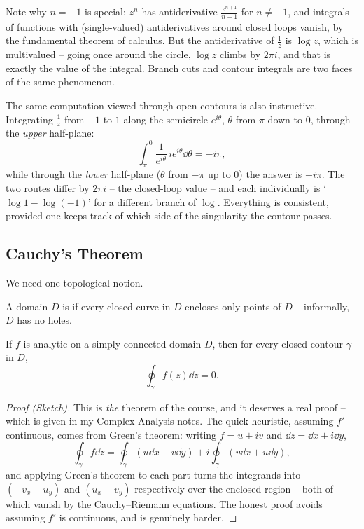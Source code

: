 Note why $n = -1$ is special: $z^n$ has antiderivative $\frac{z^{n+1}}{n+1}$ for $n \neq -1$, and integrals of functions with (single-valued) antiderivatives around closed loops vanish, by the fundamental theorem of calculus. But the antiderivative of $\frac 1z$ is $\log z$, which is multivalued -- going once around the circle, $\log z$ climbs by $2\pi i$, and that is exactly the value of the integral. Branch cuts and contour integrals are two faces of the same phenomenon.

The same computation viewed through open contours is also instructive. Integrating $\frac 1z$ from $-1$ to $1$ along the semicircle $e^{i\theta}$, $\theta$ from $\pi$ down to $0$, through the \emph{upper} half-plane:
$$
\int_\pi^0 \frac{1}{e^{i\theta}} \, ie^{i\theta} \dd \theta = -i\pi,
$$
while through the \emph{lower} half-plane ($\theta$ from $-\pi$ up to $0$) the answer is $+i\pi$. The two routes differ by $2\pi i$ -- the closed-loop value -- and each individually is `$\log 1 - \log(-1)$' for a different branch of $\log$. Everything is consistent, provided one keeps track of which side of the singularity the contour passes.

\subsection{Cauchy's Theorem}

We need one topological notion.

\begin{definition}
	A domain $D$ is  if every closed curve in $D$ encloses only points of $D$ -- informally, $D$ has no holes.
\end{definition}

\begin{theorem}
	If $f$ is analytic on a simply connected domain $D$, then for every closed contour $\gamma$ in $D$,
	$$
	\oint_\gamma f(z) \dd z = 0.
	$$
\end{theorem}
\begin{proof}[Proof (Sketch)]
	This is \emph{the} theorem of the course, and it deserves a real proof -- which is given in my Complex Analysis notes. The quick heuristic, assuming $f'$ continuous, comes from Green's theorem: writing $f = u + iv$ and $\dd z = \dd x + i \dd y$,
	$$
	\oint_\gamma f \dd z = \oint_\gamma (u \dd x - v \dd y) + i \oint_\gamma (v \dd x + u \dd y),
	$$
	and applying Green's theorem to each part turns the integrands into $(-v_x - u_y)$ and $(u_x - v_y)$ respectively over the enclosed region -- both of which vanish by the Cauchy--Riemann equations. The honest proof avoids assuming $f'$ is continuous, and is genuinely harder.
\end{proof}

